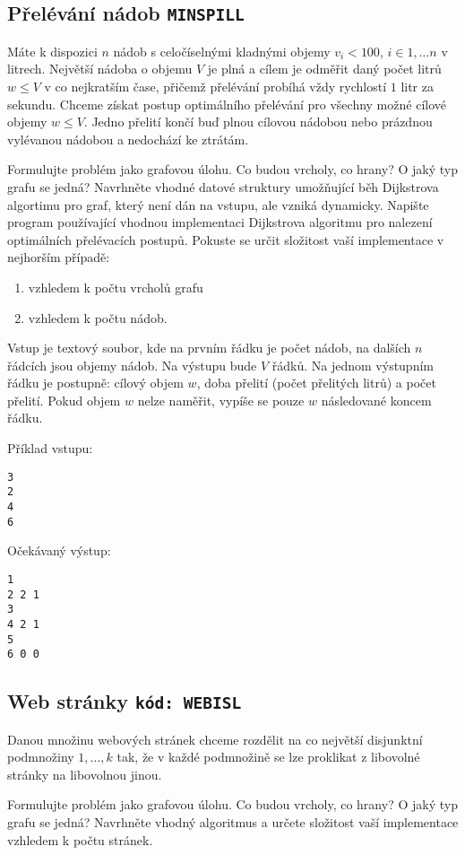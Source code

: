 \documentclass[a4paper,10pt]{article}
\begin{document}
\subsection{Přelévání nádob \hfill{\tt MINSPILL}}
 Máte k dispozici $n$ nádob s celočíselnými kladnými objemy $v_i<100$, $i\in 1,\dots n$ v litrech. 
 Největší nádoba o objemu $V$ je plná a cílem je odměřit daný počet litrů $w\le V$ v co nejkratším čase, přičemž přelévání probíhá vždy rychlostí $1$ litr za sekundu. Chceme získat postup optimálního přelévání pro všechny možné cílové objemy $w \le V$.
 Jedno přelití končí buď plnou cílovou nádobou nebo prázdnou vylévanou nádobou a nedochází ke ztrátám. 

 Formulujte problém jako grafovou úlohu. Co budou vrcholy, co hrany?  O jaký typ grafu se jedná?
 Navrhněte vhodné datové struktury umožňující běh Dijkstrova algortimu pro graf, který není dán na vstupu, ale vzniká dynamicky.
 Napište program používající vhodnou implementaci Dijkstrova algoritmu pro nalezení optimálních přelévacích postupů. 
 Pokuste se určit složitost vaší implementace v nejhorším případě: 
 \begin{enumerate}
  \item vzhledem k počtu vrcholů grafu 
  \item vzhledem k počtu nádob.
 \end{enumerate}


 Vstup je textový soubor, kde na prvním řádku je počet nádob, na dalších $n$ řádcích jsou objemy nádob.
 Na výstupu bude $V$ řádků. Na jednom výstupním řádku je postupně: cílový objem $w$, doba přelití (počet přelitých litrů) a počet přelití. Pokud objem $w$ nelze naměřit, vypíše se pouze $w$ následované koncem řádku.
 
Příklad vstupu:
\begin{verbatim}
3
2
4
6
\end{verbatim}

Očekávaný výstup:
\begin{verbatim}
1
2 2 1
3
4 2 1
5
6 0 0
\end{verbatim}


\subsection{Web stránky \hfill{\tt kód: WEBISL}}
Danou množinu webových stránek chceme rozdělit na co největší disjunktní podmnožiny $1,\dots, k$ tak,
 že v každé podmnožině se lze proklikat z libovolné stránky na libovolnou jinou. 

Formulujte problém jako grafovou úlohu. Co budou vrcholy, co hrany?  O jaký typ grafu se jedná? Navrhněte vhodný
algoritmus a určete složitost vaší implementace vzhledem k počtu stránek.
\end{document}
